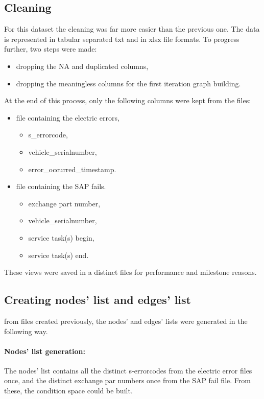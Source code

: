 	\subsection{Cleaning}
For this dataset the cleaning was far more easier than the previous one. The data is represented in tabular separated txt and in xlsx file formats.
To progress further, two steps were made:
\begin{itemize}
			\item{dropping the NA and duplicated columns,}
			\item{dropping the meaningless columns for the first iteration graph building.}
\end{itemize}

At the end of this process, only the following columns were kept from the files:
\begin{itemize}
			\item{file containing the electric errors,}
			\begin{itemize}
				\item{s\_errorcode,}
				\item{vehicle\_serialnumber,}
				\item{error\_occurred\_timestamp.}
			\end{itemize}
			\item{file containing the SAP fails.}
			\begin{itemize}
				\item{exchange part number,}
				\item{vehicle\_serialnumber,}
				\item{service task(s) begin,}
				\item{service task(s) end.}
			\end{itemize}
\end{itemize}
These views were saved in a distinct files for performance and milestone reasons.
	\subsection{Creating nodes' list and edges' list}
from files created previously, the nodes' and edges' lists were generated in the following way.
\paragraph{Nodes' list generation:}
The nodes' list contains all the distinct s-errorcodes from the electric error files once, and the distinct exchange par numbers once from the SAP fail file. From these, the condition space could be built.
